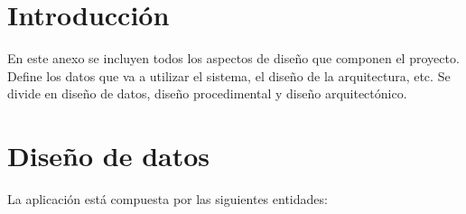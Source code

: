 
\section{Introducción}
En este anexo se incluyen todos los aspectos de diseño que componen el proyecto. \\ Define los datos que va a utilizar el sistema, el diseño de la arquitectura, etc.
Se divide en diseño de datos, diseño procedimental y diseño arquitectónico.


\section{Diseño de datos}
La aplicación está compuesta por las siguientes entidades:

